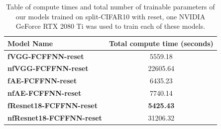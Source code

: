 \begin{appendices}
\begin{table}[ht]
    \centering
    \begin{tabular}{l c}
    \toprule
    \textbf{Model Name} & \textbf{Total compute time (seconds)} \\
    \midrule
    \textbf{fVGG-FCFFNN-reset} & 5559.18 \\
    \textbf{nfVGG-FCFFNN-reset} &  22605.64 \\
    \textbf{fAE-FCFFNN-reset} &  6435.23 \\
    \textbf{nfAE-FCFFNN-reset} &  7740.14 \\
    \textbf{fResnet18-FCFFNN-reset} & \textbf{5425.43}  \\
    \textbf{nfResnet18-FCFFNN-reset} &  31206.32 \\
    \bottomrule
    \end{tabular}
    \caption{Table of compute times and total number of trainable parameters of our models trained on split-CIFAR10 with reset, one NVIDIA GeForce RTX 2080 Ti was used to train each of these models.}
    \label{tab:compute_times_reset}
\end{table}

\FloatBarrier

\end{appendices}
